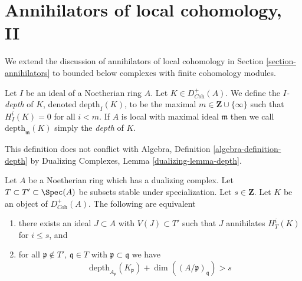 \section{Annihilators of local cohomology, II}
\label{section-annihilators-II}

\noindent
We extend the discussion of annihilators of local cohomology in
Section \ref{section-annihilators}
to bounded below complexes with finite cohomology modules.

\begin{definition}
\label{definition-depth-complex}
Let $I$ be an ideal of a Noetherian ring $A$. Let
$K \in D^+_{\textit{Coh}}(A)$. We define the {\it $I$-depth} of $K$,
denoted $\text{depth}_I(K)$, to be the maximal
$m \in \mathbf{Z} \cup \{\infty\}$ such that $H^i_I(K) = 0$ for all $i < m$.
If $A$ is local with maximal ideal $\mathfrak m$
then we call $\text{depth}_\mathfrak m(K)$ simply the {\it depth} of $K$.
\end{definition}

\noindent
This definition does not conflict with
Algebra, Definition \ref{algebra-definition-depth}
by Dualizing Complexes, Lemma \ref{dualizing-lemma-depth}.

\begin{proposition}
\label{proposition-annihilator-complex}
Let $A$ be a Noetherian ring which has a dualizing complex.
Let $T \subset T' \subset \Spec(A)$ be subsets stable under
specialization. Let $s \in \mathbf{Z}$. Let $K$ be an object of
$D_{\textit{Coh}}^+(A)$. The following are equivalent
\begin{enumerate}
\item there exists an ideal $J \subset A$ with $V(J) \subset T'$
such that $J$ annihilates $H^i_T(K)$ for $i \leq s$, and
\item for all $\mathfrak p \not \in T'$,
$\mathfrak q \in T$ with $\mathfrak p \subset \mathfrak q$
we have
$$
\text{depth}_{A_\mathfrak p}(K_\mathfrak p) +
\dim((A/\mathfrak p)_\mathfrak q) > s
$$
\end{enumerate}
\end{proposition}

